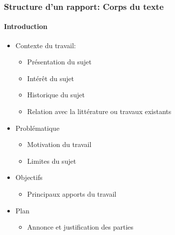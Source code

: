 \documentclass[xcolor=table]{beamer}
\begin{document}
\begin{frame}
\frametitle{Structure d'un rapport: Corps du texte}
\framesubtitle{Introduction}

\begin{minipage}{0.52\textwidth}
	\begin{itemize}
		\item Contexte du travail:
		\begin{itemize}
			\item Présentation du sujet
			\item Intérêt du sujet
			\item Historique du sujet
			\item Relation avec la littérature ou travaux existants
		\end{itemize}
		
		\item Problématique 
		\begin{itemize}
			\item Motivation du travail
			\item Limites du sujet
		\end{itemize}
		
		\item Objectifs 
		\begin{itemize}
			\item Principaux apports du travail
		\end{itemize}
		
		\item Plan 
		\begin{itemize}
			\item Annonce et justification des parties
		\end{itemize}
		

\end{itemize}
\end{minipage}
\end{frame}
\end{document}
